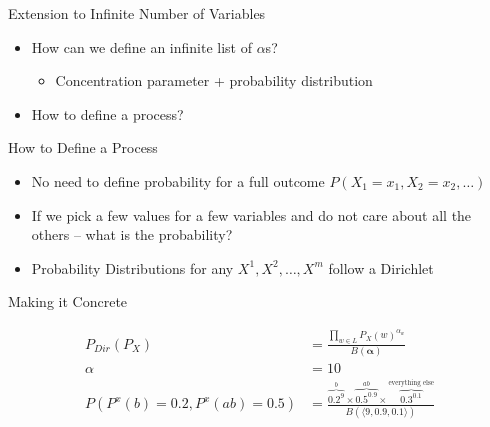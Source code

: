 \documentclass[11pt]{beamer}
\begin{document}
	\begin{frame}{Extension to Infinite Number of Variables}
		\begin{itemize}
			\item How can we define an infinite list of $\alpha$s?
			\begin{itemize}
				\item Concentration parameter + probability distribution \checkmark
			\end{itemize}
			\item How to define a process?
		\end{itemize}
	\end{frame}
	
	\begin{frame}{How to Define a Process}
		\begin{itemize}
			\item No need to define probability for a full outcome $P(X_1=x_1,X_2=x_2,\dots)$
			\item If we pick a few values for a few variables and do not care about all the others -- what is the probability?
			\item Probability Distributions for any $X^1,X^2,\dots,X^m$ follow a Dirichlet
		\end{itemize}
	\end{frame}
	
	\begin{frame}{Making it Concrete}
		\centering
		
		
		\begin{align*}
			P_{Dir}(P_X) & = \frac{\prod_{w \in L} P_{X}(w)^{\alpha_w}}{B(\boldsymbol{\alpha})} \\
			\alpha & = 10 \\
		P(P^x(b) = 0.2,P^{x}(ab) = 0.5) & = \frac{\overbrace{0.2^{9}}^{b} \times \overbrace{0.5^{0.9}}^{ab} \times
			\overbrace{0.3^{0.1}}^{\text{everything else}}}{B(\langle 9,0.9,0.1 \rangle)}
		\end{align*}
	\end{frame}
	
\end{document}
